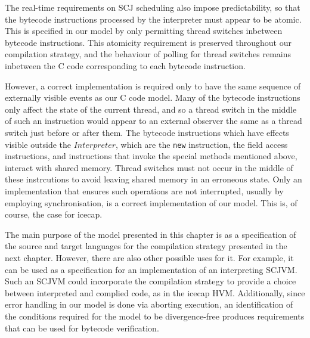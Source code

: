 The real-time requirements on SCJ scheduling also impose
predictability, so that the bytecode instructions processed by the
interpreter must appear to be atomic.
This is specified in our model by only permitting thread switches
inbetween bytecode instructions.
This atomicity requirement is preserved throughout our compilation
strategy, and the behaviour of polling for thread switches remains
inbetween the C code corresponding to each bytecode instruction.

However, a correct implementation is required only to have the same
sequence of externally visible events as our C code model.
Many of the bytecode instructions only affect the state of the current
thread, and so a thread switch in the middle of such an instruction
would appear to an external observer the same as a thread switch just
before or after them.
The bytecode instructions which have effects visible outside the
$Interpreter$, which are the \texttt{new} instruction, the field
access instructions, and instructions that invoke the special methods
mentioned above, interact with shared memory.
Thread switches must not occur in the middle of these instrcutions to
avoid leaving shared memory in an erroneous state.
Only an implementation that ensures such operations are not
interrupted, usually by employing synchronisation, is a correct
implementation of our model.
This is, of course, the case for icecap.

The main purpose of the model presented in this chapter is as a
specification of the source and target languages for the compilation
strategy presented in the next chapter.
However, there are also other possible uses for it.
For example, it can be used as a specification for an implementation
of an interpreting SCJVM.
Such an SCJVM could incorporate the compilation strategy to provide a
choice between interpreted and complied code, as in the icecap HVM.
Additionally, since error handling in our model is done via aborting
execution, an identification of the conditions required for the model
to be divergence-free produces requirements that can be used for
bytecode verification.

